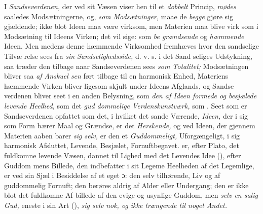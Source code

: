 I \emph{Sandseverdenen,} der ved sit Væsen viser hen til et
\emph{dobbelt} Princip, \emph{mødes} saaledes Modsætningerne, og, \emph{som
Modsætninger,} maae de \emph{begge} gjøre sig gjældende; ikke
blot Ideen maa være virksom, men Materien maa blive virk\-%
som i Modsætning til Ideens Virken; det vil sige: som \emph{be\-%
grændsende} og \emph{hæmmende} Ideen. Men medens denne
hæmmende Virksomhed fremhæves hvor den sandselige Tilvæ\-%
relse sees fra \emph{sin Sandselighedsside,} d. v. s. i det Sand\-%
seliges Udstykning, saa træder den tilbage naar Sandseverdenen
sees \emph{som Totalitet;} Modsætningen bliver saa \emph{af Anskuel\-%
sen} ført tilbage til en harmonisk Enhed, Materiens hæmmende
Virken bliver ligesom skjult under Ideens Afglands, og Sandse\-%
verdenen bliver seet i en anden Belysning, som \emph{den af Ideen
formede og besjælede levende Heelhed,} som det \emph{gud\-%
dommelige Verdenskunstværk,} som . Seet som
 er Sandseverdenen opfattet som det, i hvilket det sande
Værende, \emph{Ideen,} der i sig som Form bærer Maal og Grændse, er
det \emph{Herskende,} og ved Ideen, der gjennem Materien aaben\-%
barer \emph{sig selv,} er den et \emph{Guddommeligt,} Uforgængeligt,
i sig harmonisk Afsluttet, Levende, Besjælet, Fornuftbegavet.
 er, efter Plato, det fuldkomne levende Væsen, dannet
til Lighed med det Levendes Idee (), efter Guddom\-%
mens Billede, den indbefatter i sit Legeme Heelheden af det
Legemlige, er ved sin Sjæl i Besiddelse af et eget ɔ: den selv
tilhørende, Liv og af guddommelig Fornuft; den berøres aldrig
af Alder eller Undergang; den er ikke blot det fuldkomne Af\-%
billede af den evige og usynlige Guddom, men \emph{selv en salig}
 \setcounter{footnote}{0}%
\emph{Gud,} eneste i sin Art (), \emph{sig selv nok, og ikke
trængende til noget Andet.}

